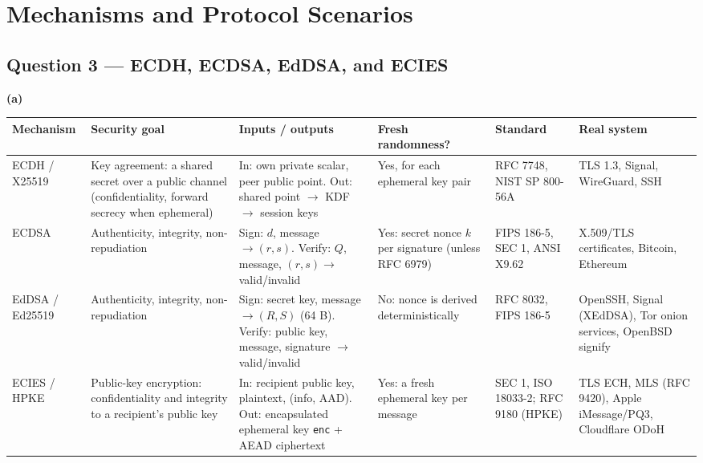 \documentclass[11pt,a4paper]{article}
\begin{document}
\clearpage
\section*{Mechanisms and Protocol Scenarios}

\subsection*{Question 3 --- ECDH, ECDSA, EdDSA, and ECIES}
\begin{table}[H]
\textbf{(a)}\par\smallskip
\centering\small
\begin{tabularx}{\textwidth}{@{}P{1.9cm}LLP{2.0cm}P{2.1cm}P{2.3cm}@{}}
\toprule
Mechanism & Security goal & Inputs / outputs & Fresh randomness? & Standard & Real system \\
\midrule
ECDH / X25519 & Key agreement: a shared secret over a public channel (confidentiality, forward secrecy when ephemeral) & In: own private scalar, peer public point. Out: shared point $\to$ KDF $\to$ session keys & Yes, for each ephemeral key pair & RFC 7748, NIST SP 800-56A & TLS 1.3, Signal, WireGuard, SSH \\
ECDSA & Authenticity, integrity, non-repudiation & Sign: $d$, message $\to (r,s)$. Verify: $Q$, message, $(r,s)\to$ valid/invalid & Yes: secret nonce $k$ per signature (unless RFC 6979) & FIPS 186-5, SEC 1, ANSI X9.62 & X.509/TLS certificates, Bitcoin, Ethereum \\
EdDSA / Ed25519 & Authenticity, integrity, non-repudiation & Sign: secret key, message $\to (R,S)$ (64 B). Verify: public key, message, signature $\to$ valid/invalid & No: nonce is derived deterministically & RFC 8032, FIPS 186-5 & OpenSSH, Signal (XEdDSA), Tor onion services, OpenBSD signify \\
ECIES / HPKE & Public-key encryption: confidentiality and integrity to a recipient's public key & In: recipient public key, plaintext, (info, AAD). Out: encapsulated ephemeral key \texttt{enc} + AEAD ciphertext & Yes: a fresh ephemeral key per message & SEC 1, ISO 18033-2; RFC 9180 (HPKE) & TLS ECH, MLS (RFC 9420), Apple iMessage/PQ3, Cloudflare ODoH \\
\bottomrule
\end{tabularx}
\end{table}
\end{document}
